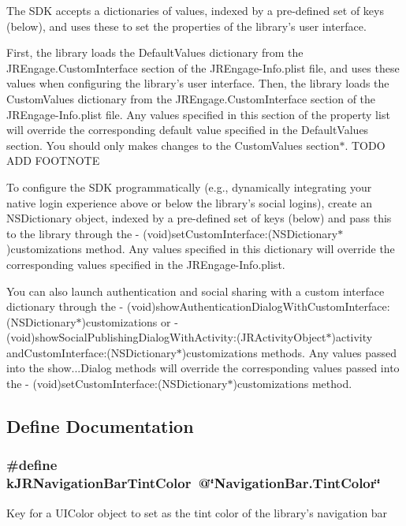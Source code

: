 The SDK accepts a dictionaries of values, indexed by a pre-\/defined set of keys (below), and uses these to set the properties of the library's user interface.

First, the library loads the DefaultValues dictionary from the JREngage.CustomInterface section of the JREngage-\/Info.plist file, and uses these values when configuring the library's user interface. Then, the library loads the CustomValues dictionary from the JREngage.CustomInterface section of the JREngage-\/Info.plist file. Any values specified in this section of the property list will override the corresponding default value specified in the DefaultValues section. You should only makes changes to the CustomValues section$\ast$. TODO ADD FOOTNOTE

To configure the SDK programmatically (e.g., dynamically integrating your native login experience above or below the library's social logins), create an NSDictionary object, indexed by a pre-\/defined set of keys (below) and pass this to the library through the -\/ (void)setCustomInterface:(NSDictionary$\ast$)customizations method. Any values specified in this dictionary will override the corresponding values specified in the JREngage-\/Info.plist.

You can also launch authentication and social sharing with a custom interface dictionary through the -\/ (void)showAuthenticationDialogWithCustomInterface:(NSDictionary$\ast$)customizations or -\/ (void)showSocialPublishingDialogWithActivity:(JRActivityObject$\ast$)activity andCustomInterface:(NSDictionary$\ast$)customizations methods. Any values passed into the show...Dialog methods will override the corresponding values passed into the -\/ (void)setCustomInterface:(NSDictionary$\ast$)customizations method. 

\subsection{Define Documentation}
\hypertarget{group__custom_interface_ga7c7ed7dac155537c9bc14531c5cec3cb}{
\subsubsection[{kJRNavigationBarTintColor}]{\setlength{\rightskip}{0pt plus 5cm}\#define kJRNavigationBarTintColor~@\char`\"{}NavigationBar.TintColor\char`\"{}}}
\label{group__custom_interface_ga7c7ed7dac155537c9bc14531c5cec3cb}
Key for a {\ttfamily UIColor} object to set as the tint color of the library's navigation bar

